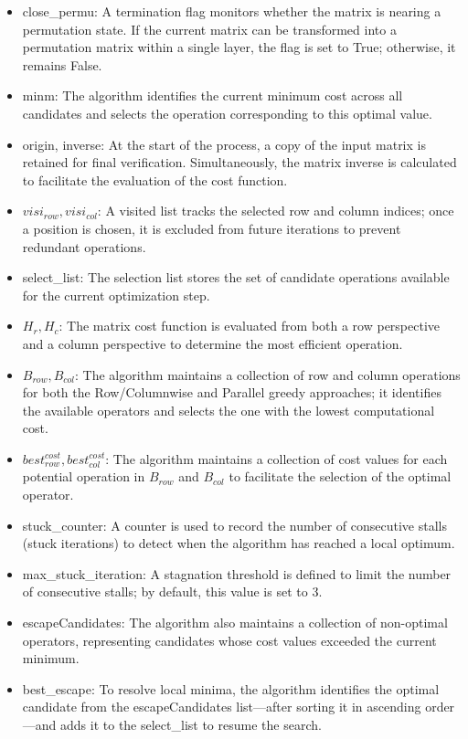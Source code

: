 \begin{itemize}
    \item close\_permu: A termination flag monitors whether the matrix is nearing a permutation state. If the current matrix can be transformed into a permutation matrix within a single layer, the flag is set to True; otherwise, it remains False.
    \item minm: The algorithm identifies the current minimum cost across all candidates and selects the operation corresponding to this optimal value.
    \item origin, inverse: At the start of the process, a copy of the input matrix is retained for final verification. Simultaneously, the matrix inverse is calculated to facilitate the evaluation of the cost function.
    \item $visi_{row}, visi_{col}$: A visited list tracks the selected row and column indices; once a position is chosen, it is excluded from future iterations to prevent redundant operations.
    \item select\_list: The selection list stores the set of candidate operations available for the current optimization step.
    \item $H_{r}, H_{c}$: The matrix cost function is evaluated from both a row perspective and a column perspective to determine the most efficient operation.
    \item $B_{row}, B_{col}$: The algorithm maintains a collection of row and column operations for both the Row/Column\-wise and Parallel greedy approaches; it identifies the available operators and selects the one with the lowest computational cost.
    \item $best_{row}^{cost}, best_{col}^{cost}$: The algorithm maintains a collection of cost values for each potential operation in $B_{row}$ and $B_{col}$ to facilitate the selection of the optimal operator.
    \item stuck\_counter: A counter is used to record the number of consecutive stalls (stuck iterations) to detect when the algorithm has reached a local optimum.
    \item max\_stuck\_iteration: A stagnation threshold is defined to limit the number of consecutive stalls; by default, this value is set to 3.
    \item escapeCandidates: The algorithm also maintains a collection of non-optimal operators, representing candidates whose cost values exceeded the current minimum.
    \item best\_escape: To resolve local minima, the algorithm identifies the optimal candidate from the escapeCandidates list—after sorting it in ascending order—and adds it to the select\_list to resume the search.

\end{itemize}
